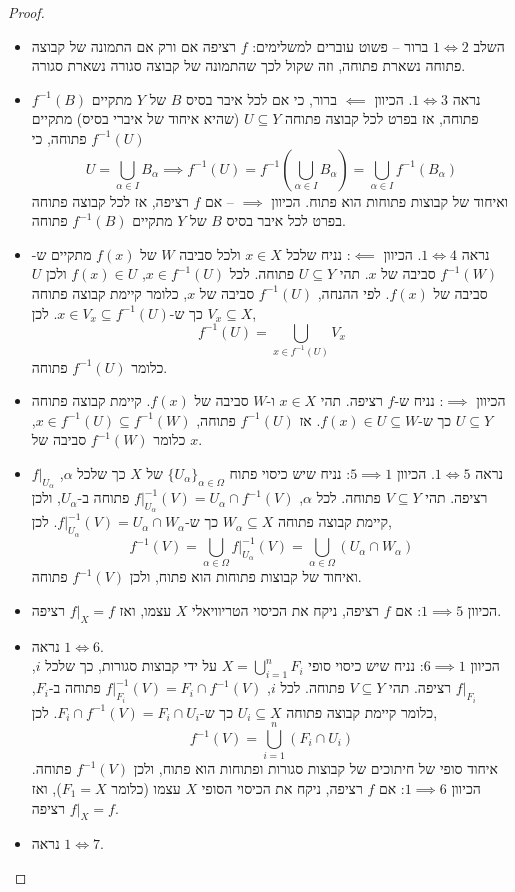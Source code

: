 \documentclass{tstextbook}
\begin{document}
\begin{proof}
  \begin{itemize}
    \item השלב \(1 \iff 2\) ברור – פשוט עוברים למשלימים: \(f\) רציפה אם ורק אם התמונה של קבוצה פתוחה נשארת פתוחה, וזה שקול לכך שהתמונה של קבוצה סגורה נשארת סגורה.
    \item נראה \(1 \iff 3\). הכיוון \(\impliedby\) ברור, כי אם לכל איבר בסיס \(B\) של \(Y\) מתקיים \(f^{-1}(B)\) פתוחה, אז בפרט לכל קבוצה פתוחה \(U \subseteq Y\) (שהיא איחוד של איברי בסיס) מתקיים \(f^{-1}(U)\) פתוחה, כי
$$U = \bigcup_{\alpha \in I} B_\alpha \implies f^{-1}(U) = f^{-1}\left(\bigcup_{\alpha \in I} B_\alpha\right) = \bigcup_{\alpha \in I} f^{-1}(B_\alpha)
$$
ואיחוד של קבוצות פתוחות הוא פתוח.
הכיוון \(\implies\) – אם \(f\) רציפה, אז לכל קבוצה פתוחה בפרט לכל איבר בסיס \(B\) של \(Y\) מתקיים \(f^{-1}(B)\) פתוחה.
    \item נראה \(1 \iff 4\). הכיוון \(\impliedby\): נניח שלכל \(x \in X\) ולכל סביבה \(W\) של \(f(x)\) מתקיים ש-\(f^{-1}(W)\) סביבה של \(x\). תהי \(U \subseteq Y\) פתוחה. לכל \(x \in f^{-1}(U)\), \(f(x) \in U\) ולכן \(U\) סביבה של \(f(x)\). לפי ההנחה, \(f^{-1}(U)\) סביבה של \(x\), כלומר קיימת קבוצה פתוחה \(V_x \subseteq X\) כך ש-\(x \in V_x \subseteq f^{-1}(U)\). לכן,
$$f^{-1}(U) = \bigcup_{x \in f^{-1}(U)} V_x
$$
כלומר \(f^{-1}(U)\) פתוחה.
    \item הכיוון \(\implies\): נניח ש-\(f\) רציפה. תהי \(x \in X\) ו-\(W\) סביבה של \(f(x)\). קיימת קבוצה פתוחה \(U \subseteq Y\) כך ש-\(f(x) \in U \subseteq W\). אז \(f^{-1}(U)\) פתוחה, \(x \in f^{-1}(U) \subseteq f^{-1}(W)\), כלומר \(f^{-1}(W)\) סביבה של \(x\).
    \item נראה \(1 \iff 5\). הכיוון \(5 \implies 1\): נניח שיש כיסוי פתוח \(\{U_\alpha\}_{\alpha \in \Omega}\) של \(X\) כך שלכל \(\alpha\), \(f|_{U_\alpha}\) רציפה. תהי \(V \subseteq Y\) פתוחה. לכל \(\alpha\), \(f|_{U_\alpha}^{-1}(V) = U_\alpha \cap f^{-1}(V)\) פתוחה ב-\(U_\alpha\), ולכן קיימת קבוצה פתוחה \(W_\alpha \subseteq X\) כך ש-\(f|_{U_\alpha}^{-1}(V) = U_\alpha \cap W_\alpha\). לכן,
$$f^{-1}(V) = \bigcup_{\alpha \in \Omega} f|_{U_\alpha}^{-1}(V) = \bigcup_{\alpha \in \Omega} (U_\alpha \cap W_\alpha)
$$
ואיחוד של קבוצות פתוחות הוא פתוח, ולכן \(f^{-1}(V)\) פתוחה.
    \item הכיוון \(1 \implies 5\): אם \(f\) רציפה, ניקח את הכיסוי הטריוויאלי \(X\) עצמו, ואז \(f|_X = f\) רציפה.
    \item נראה \(1 \iff 6\).\\

הכיוון \(6 \implies 1\): נניח שיש כיסוי סופי \(X = \bigcup_{i=1}^n F_i\) על ידי קבוצות סגורות, כך שלכל \(i\), \(f|_{F_i}\) רציפה. תהי \(V \subseteq Y\) פתוחה. לכל \(i\), \(f|_{F_i}^{-1}(V) = F_i \cap f^{-1}(V)\) פתוחה ב-\(F_i\), כלומר קיימת קבוצה פתוחה \(U_i \subseteq X\) כך ש-\(F_i \cap f^{-1}(V) = F_i \cap U_i\). לכן,
$$f^{-1}(V) = \bigcup_{i=1}^n (F_i \cap U_i)
$$
איחוד סופי של חיתוכים של קבוצות סגורות ופתוחות הוא פתוח, ולכן \(f^{-1}(V)\) פתוחה.
הכיוון \(1 \implies 6\): אם \(f\) רציפה, ניקח את הכיסוי הסופי \(X\) עצמו (כלומר \(F_1 = X\)), ואז \(f|_X = f\) רציפה.
    \item נראה \(1 \iff 7\).\\


\end{itemize}
\end{proof}
\end{document}
